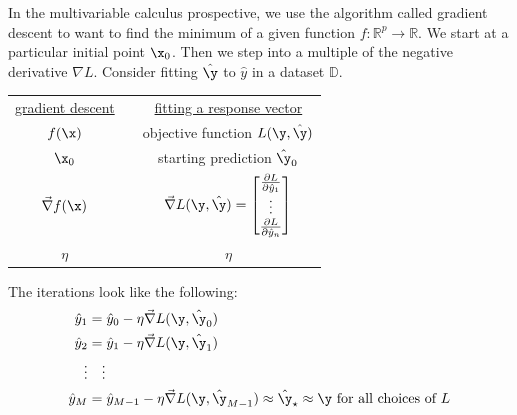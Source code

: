 \documentclass[12pt]{article}
\begin{document}
\begin{enumerate}

\begin{tcolorbox}[colback=white, sharp corners]
In the multivariable calculus prospective, we use the algorithm called gradient descent to want to find the minimum of a given function $f: \mathbb{R}^p \to \mathbb{R}$. We start at a particular initial point $\x_0$. Then we step into a multiple of the negative derivative $\nabla L$. 
Consider fitting $\hat{\y}$ to $\hat{y}$ in a dataset $\mathbb{D}$.
\begin{center} 
\begin{tabular}{ccc}
\underline{gradient descent} & & \underline{fitting a response vector} \\
$f(\x)$ & & objective function $L(\y, \hat{\y})$\\
$\x_0$ & & starting prediction $\hat{\y}_0$ \\
$\vec{\nabla} f(\x)$ & & $\vec{\nabla} L(\y, \hat{\y}) = \begin{bmatrix}
\pdv{L}{\hat{y}_1} \\
\vdots \\ 
\pdv{L}{\hat{y}_n}
\end{bmatrix}$ \\
$\eta$ & & $\eta$
\end{tabular}
\end{center}

The iterations look like the following: 
\begin{align*}
\hat{y}_1 &= \hat{y}_0 - \eta \vec{\nabla}L(\y, \hat{\y}_0) \\
\hat{y}_2 &= \hat{y}_1 - \eta \vec{\nabla}L(\y, \hat{\y}_1) \\
\vdots & \quad \vdots \\
\hat{y}_M &= \hat{y}_{M-1} - \eta \vec{\nabla}L(\y, \hat{\y}_{M-1}) \approx \hat{\y}_{\star} \approx \y \text{ for all choices of }L
\end{align*}
\end{tcolorbox}

\newpage



\end{enumerate}
\end{document}
